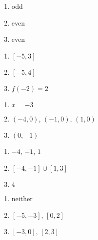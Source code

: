 \begin{multicols}{3}
\begin{enumerate}
\setcounter{enumi}{\value{HW}}

\item odd
\item even
\item even

\setcounter{HW}{\value{enumi}}
\end{enumerate}
\end{multicols}


\begin{multicols}{3}
\begin{enumerate}
\setcounter{enumi}{\value{HW}}

\item  $[-5,3]$
\item  $[-5,4]$
\item  $f(-2) = 2$

\setcounter{HW}{\value{enumi}}
\end{enumerate}
\end{multicols}

\begin{multicols}{3}
\begin{enumerate}
\setcounter{enumi}{\value{HW}}

\item  $x=-3$
\item $(-4,0)$, $(-1,0)$, $(1,0)$
\item  $(0,-1)$

\setcounter{HW}{\value{enumi}}
\end{enumerate}
\end{multicols}

\begin{multicols}{3}
\begin{enumerate}
\setcounter{enumi}{\value{HW}}

\item  $-4$, $-1$, $1$
\item  $[-4,-1] \cup [1,3]$
\item  $4$

\setcounter{HW}{\value{enumi}}
\end{enumerate}
\end{multicols}

\begin{multicols}{3}
\begin{enumerate}
\setcounter{enumi}{\value{HW}}

\item  neither
\item  $[-5,-3]$, $[0,2]$
\item  $[-3,0]$, $[2,3]$

\setcounter{HW}{\value{enumi}}
\end{enumerate}
\end{multicols}

